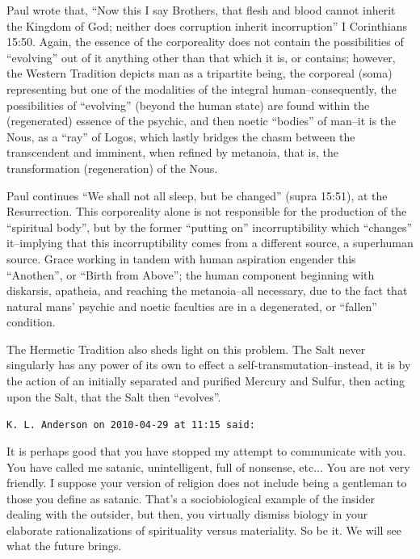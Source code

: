 \begin{footnotesize}
\begin{sffamily}
Paul wrote that, ``Now this I say Brothers, that flesh and blood cannot inherit the Kingdom of God; neither does corruption inherit incorruption'' I Corinthians 15:50. Again, the essence of the corporeality does not contain the possibilities of ``evolving'' out of it anything other than that which it is, or contains; however, the Western Tradition depicts man as a tripartite being, the corporeal (soma) representing but one of the modalities of the integral human--consequently, the possibilities of ``evolving'' (beyond the human state) are found within the (regenerated) essence of the psychic, and then noetic ``bodies'' of man--it is the Nous, as a ``ray'' of Logos, which lastly bridges the chasm between the transcendent and imminent, when refined by metanoia, that is, the transformation (regeneration) of the Nous.

Paul continues ``We shall not all sleep, but be changed'' (supra 15:51), at the Resurrection. This corporeality alone is not responsible for the production of the ``spiritual body'', but by the former ``putting on'' incorruptibility which ``changes'' it--implying that this incorruptibility comes from a different source, a superhuman source. Grace working in tandem with human aspiration engender this ``Anothen'', or ``Birth from Above''; the human component beginning with diskarsis, apatheia, and reaching the metanoia--all necessary, due to the fact that natural mans' psychic and noetic faculties are in a degenerated, or ``fallen'' condition.

The Hermetic Tradition also sheds light on this problem. The Salt never singularly has any power of its own to effect a self-transmutation--instead, it is by the action of an initially separated and purified Mercury and Sulfur, then acting upon the Salt, that the Salt then ``evolves''.

\hfill

\texttt{K. L. Anderson on 2010-04-29 at 11:15 said:}

It is perhaps good that you have stopped my attempt to communicate with you. You have called me satanic, unintelligent, full of nonsense, etc... You are not very friendly. I suppose your version of religion does not include being a gentleman to those you define as satanic. That's a sociobiological example of the insider dealing with the outsider, but then, you virtually dismiss biology in your elaborate rationalizations of spirituality versus materiality. So be it. We will see what the future brings.

\hfill


\end{sffamily}
\end{footnotesize}
